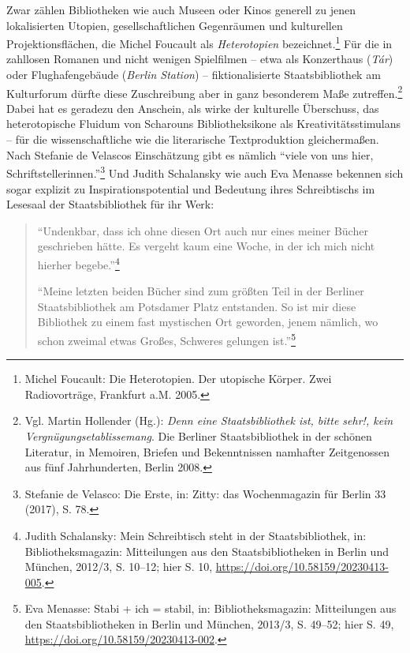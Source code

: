 \documentclass[a4paper,
fontsize=11pt,
oneside,
numbers=noperiodatend,
parskip=half-,
bibliography=totoc,
final
]{scrartcl}
\begin{document}
Zwar zählen Bibliotheken wie auch Museen oder Kinos generell zu jenen
lokalisierten Utopien, gesellschaftlichen Gegenräumen und kulturellen
Projektionsflächen, die Michel Foucault als \emph{Heterotopien}
bezeichnet.\footnote{Michel Foucault: Die Heterotopien. Der utopische
  Körper. Zwei Radiovorträge, Frankfurt a.M. 2005.} Für die in zahllosen
Romanen und nicht wenigen Spielfilmen -- etwa als Konzerthaus
(\emph{Tár}) oder Flughafengebäude (\emph{Berlin Station}) --
fiktionalisierte Staatsbibliothek am Kulturforum dürfte diese
Zuschreibung aber in ganz besonderem Maße zutreffen.\footnote{Vgl.
  Martin Hollender (Hg.): \emph{Denn eine Staatsbibliothek ist, bitte
  sehr!, kein Vergnügungsetablissemang}. Die Berliner Staatsbibliothek
  in der schönen Literatur, in Memoiren, Briefen und Bekenntnissen
  namhafter Zeitgenossen aus fünf Jahrhunderten, Berlin 2008.} Dabei hat
es geradezu den Anschein, als wirke der kulturelle Überschuss, das
heterotopische Fluidum von Scharouns Bibliotheksikone als
Kreativitätsstimulans -- für die wissenschaftliche wie die literarische
Textproduktion gleichermaßen. Nach Stefanie de Velascos Einschätzung
gibt es nämlich \enquote{viele von uns hier,
Schriftstellerinnen.}\footnote{Stefanie de Velasco: Die Erste, in:
  Zitty: das Wochenmagazin für Berlin 33 (2017), S. 78.} Und Judith
Schalansky wie auch Eva Menasse bekennen sich sogar explizit zu
Inspirationspotential und Bedeutung ihres Schreibtischs im Lesesaal der
Staatsbibliothek für ihr Werk:

\begin{quote}
\enquote{Undenkbar, dass ich ohne diesen Ort auch nur eines meiner
Bücher geschrieben hätte. Es vergeht kaum eine Woche, in der ich mich
nicht hierher begebe.}\footnote{Judith Schalansky: Mein Schreibtisch
  steht in der Staatsbibliothek, in: Bibliotheksmagazin: Mitteilungen
  aus den Staatsbibliotheken in Berlin und München, 2012/3, S. 10--12;
  hier S. 10, \url{https://doi.org/10.58159/20230413-005}.}

\enquote{Meine letzten beiden Bücher sind zum größten Teil in der
Berliner Staatsbibliothek am Potsdamer Platz entstanden. So ist mir
diese Bibliothek zu einem fast mystischen Ort geworden, jenem nämlich,
wo schon zweimal etwas Großes, Schweres gelungen ist.}\footnote{Eva
  Menasse: Stabi + ich = stabil, in: Bibliotheksmagazin: Mitteilungen
  aus den Staatsbibliotheken in Berlin und München, 2013/3, S. 49--52;
  hier S. 49, \url{https://doi.org/10.58159/20230413-002}.}
\end{quote}
\end{document}
